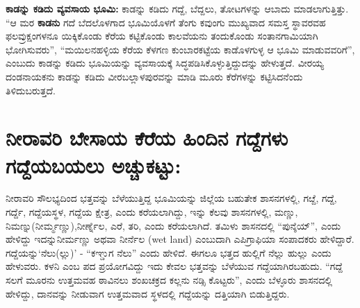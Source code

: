 \textbf{ಕಾಡನ್ನು ಕಡಿದು ವ್ಯವಸಾಯ ಭೂಮಿ:} ಕಾಡನ್ನು ಕಡಿದು ಗದ್ದೆ, ಬೆದ್ದಲು, ತೋಟಗಳನ್ನು ಆಬಾದು ಮಾಡಲಾಗುತ್ತಿತ್ತು. “ಆ ಮರ \textbf{ಕಾಡನು} ಗದೆ ಬೆದಲೊಳಗಾದ ಭೂಮಿಯೊಳಗೆ ತೆಂಗು ಕವುಂಗು ಮುಖ್ಯವಾದ ಸಮಸ್ತ ಸ್ಥಾವರವಹ ಫಲವ್ರುಕ್ಷಂ\break ಗಳನೂ ಯಿಕ್ಕಿಕೊಂಡು ಕೆರೆಯ ಕಟ್ಟಿಕೊಂಡು ಕಾಲವೆಯನು ತಂದುಕೊಂಡು ಸಂತಾನಗಾಮಿಯಾಗಿ ಭೋಗಿಸುವರು”, “ಮಯಿಲನಹಳ್ಳಿಯ ಕೆರೆಯ ಕೆಳಗಣ ಕುಂಬಾರಕಟ್ಟೆಯ ಕಾಡೊಳಗುಳ್ಳ ಆ ಭೂಮಿ ಮಾಡುವವರಿಗೆ”, ಎಂಬುದು ಕಾಡನ್ನು ಕಡಿದು ಭೂಮಿಯನ್ನು ವ್ಯವಸಾಯಕ್ಕೆ ಸಿದ್ಧಪಡಿಸಿಕೊಳ್ಳುತ್ತಿದ್ದುದನ್ನು ಹೇಳುತ್ತದೆ. ವೀರಯ್ಯ ದಂಡನಾಯಕನು ಕಾಡನ್ನು ಕಡಿದು ವೀರಬಲ್ಲಾಳಪುರವನ್ನು ಮಾಡಿ ಮೂರು ಕೆರೆಗಳನ್ನು ಕಟ್ಟಿಸಿದನೆಂದು ತಿಳಿದುಬರುತ್ತದೆ.

\section{ನೀರಾವರಿ ಬೇಸಾಯ \enginline{-} ಕೆರೆಯ ಹಿಂದಿನ ಗದ್ದೆಗಳು \enginline{-} ಗದ್ದೆಯಬಯಲು \enginline{-} ಅಚ್ಚುಕಟ್ಟು:}

ನೀರಾವರಿ ಸೌಲಭ್ಯದಿಂದ ಭತ್ತವನ್ನು ಬೆಳೆಯುತ್ತಿದ್ದ ಭೂಮಿಯನ್ನು ಜಿಲ್ಲೆಯ ಬಹುತೇಕ ಶಾಸನಗಳಲ್ಲಿ, ಗೞ್ದೆ, ಗದ್ದೆ, ಗರ್ದ್ದೆ, ಗದ್ದೆಯ\break ಸ್ಥಳ, ಗದ್ದೆಯ ಕ್ಷೇತ್ರ, ಎಂದು ಕರೆಯಲಾಗಿದ್ದು, ಇನ್ನು ಕೆಲವು ಶಾಸನಗಳಲ್ಲಿ, ಮಣ್ಣು, ನಿಮಣ್ನು(ನೀರ್ಮ್ಮಣ್ಣು),\break ನೀರ್ಣ್ನೆಲ, ಎರೆ, ತರಿ, ಎಂದು ಕರೆಯಲಾಗಿದೆ. ತಮಿಳು ಶಾಸನದಲ್ಲಿ “ಪುನ್ಶೆಯ್​”, ಎಂದು ಹೇಳಿದ್ದು ಇದನ್ನು\break ನೀರ್ಮಣ್ಣು ಅಥವಾ ನೀರ್ನೆಲ (wet land) ಎಂಬುದಾಗಿ ಎಪಿಗ್ರಾಫಿಯಾ ಸಂಪಾದಕರು ಹೇಳಿದ್ದಾರೆ. ಗದ್ದೆಯನ್ನು\break ‘ನೆಲು(ಲ್ಲು)’ - “ಕಞ್ಡುಗ ನೆಲು” ಎಂದು ಹೇಳಿದೆ. ಈಗಲೂ ಭತ್ತದ ಹುಲ್ಲಿಗೆ ನೆಲ್ಲು ಹುಲ್ಲು ಎಂದು ಹೇಳುವರು. ಕಳನಿ ಎಂಬ ಪದ ಪ್ರಯೋಗವಿದ್ದು ಇದು ಕೇವಲ ಭತ್ತವನ್ನು ಬೆಳೆಯುವ ಗದ್ದೆಯಾಗಿರಬಹುದು. “ಗದ್ದೆ ಸಲಗೆ ಮೂರನು ಉತ್ತಮವಹ ಠಾವಿನಲು ಶಂಖಚಕ್ರದ ಕಲ್ಲನು ನಡ್ಸಿ ಕೊಟ್ಟರು”, ಎಂದು ಬೆಳ್ಳೂರು ಶಾಸನದಲ್ಲಿ ಹೇಳಿದ್ದು, ದಾನವನ್ನು ನೀಡುವಾಗ ಉತ್ತಮವಾದ ಸ್ಥಳದಲ್ಲಿ ಗದ್ದೆಯನ್ನು ದತ್ತಿಯಾಗಿ ಬಿಡುತ್ತಿದ್ದರು.

\vskip 2pt

